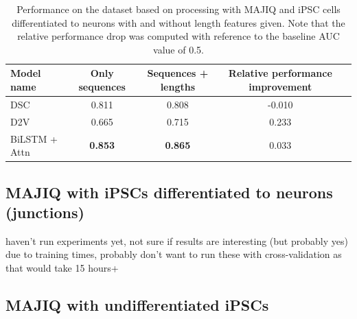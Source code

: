 


\begin{table}[h!]
	\centering
	\begin{tabular}{| l | c | c | c| c} 
		\hline
		Model name & Only sequences & Sequences + lengths & Relative performance improvement\\
		\hline
		DSC & 0.811 & 0.808 & -0.010\\
		D2V & 0.665 & 0.715 & 0.233\\
		BiLSTM + Attn & \textbf{0.853} & \textbf{0.865} & 0.033\\
		\hline
	\end{tabular}
	\caption{Performance on the dataset based on processing with MAJIQ and iPSC cells differentiated to neurons with and without length features given. Note that the relative performance drop was computed with reference to the baseline AUC value of 0.5.
	}
	\label{table:results_hexevent}
\end{table}



\subsection{MAJIQ with iPSCs differentiated to neurons (junctions)}
haven't run experiments yet, not sure if results are interesting (but probably yes)\\
due to training times, probably don't want to run these with cross-validation as that would take 15 hours+


\subsection{MAJIQ with undifferentiated iPSCs} \label{subsec:hipsci_ipsc_majiq}


